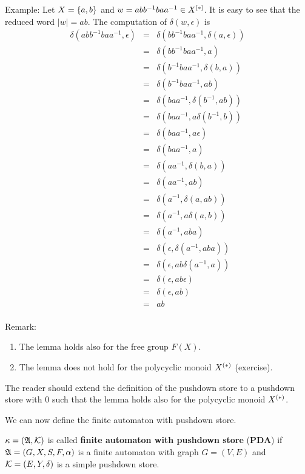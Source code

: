 Example: Let $X=\mbox{$\{a,b\}$}$ and $w=abb^{-1}baa^{-1}\in \mbox{${X}^{[*]}$}$. It is
easy to see that the reduced word $|w|=ab$. The computation of $\delta(w,\epsilon)$ is
\begin{eqnarray*}
\delta(abb^{-1}baa^{-1}, \epsilon)
&=&\delta(bb^{-1}baa^{-1}, \delta(a,\epsilon)) \\
&=&\delta(bb^{-1}baa^{-1}, a) \\
&=&\delta(b^{-1}baa^{-1}, \delta(b, a)) \\
&=&\delta(b^{-1}baa^{-1}, ab)\\
&=&\delta(baa^{-1}, \delta(b^{-1}, ab)) \\
&=&\delta(baa^{-1}, a \delta(b^{-1}, b)) \\
&=&\delta(baa^{-1}, a \epsilon) \\
&=&\delta(baa^{-1}, a) \\
&=&\delta(aa^{-1}, \delta(b,a)) \\
&=&\delta(aa^{-1}, a b) \\
&=&\delta(a^{-1}, \delta(a,ab)) \\
&=&\delta(a^{-1}, a \delta(a,b)) \\
&=&\delta(a^{-1}, a b a) \\
&=&\delta(\epsilon, \delta(a^{-1}, aba)) \\
&=&\delta(\epsilon, a b \delta(a^{-1}, a)) \\
&=&\delta(\epsilon, a b \epsilon) \\
&=&\delta(\epsilon, a b) \\
&=&a b \\
\end{eqnarray*}

Remark:
\begin{enumerate}
  \item The lemma holds also for the free group $F(X)$.
  \item The lemma does not hold for the polycyclic monoid $\mbox{${X}^{(*)}$}$
  (exercise).
\end{enumerate}

The reader should extend the definition of the pushdown store to a
pushdown store with 0 such that the lemma holds also for the polycyclic monoid
$\mbox{${X}^{(*)}$}$.

We can now define the finite automaton with pushdown store.

\begin{definition}
$\kappa = (\mbox{$\mathfrak{A}$}, \mbox{$\mathcal{K}$})$ is called {\bf finite automaton with
pushdown store} ({\bf PDA}) if $\mbox{$\mathfrak{A}$} = (G, X, S, F, \alpha)$ is a
finite automaton with graph $G = (V, E)$ and $\mbox{$\mathcal{K}$} = (E, Y,\delta)$ is a
simple pushdown store.
\end{definition}

